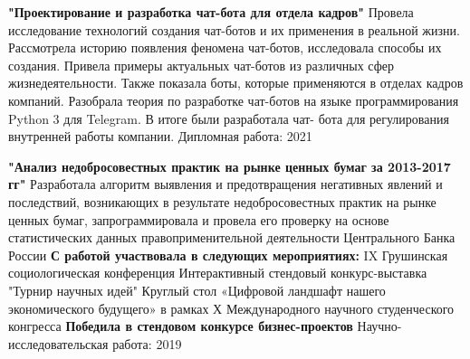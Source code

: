 \documentclass[]{awesome-cv}
\begin{document}
\vspace{-11mm}
\begin{cventries}
\cventry
	{\textbf{"Проектирование и разработка чат-бота для отдела кадров"}
	\newline \qquad \bullet Провела исследование технологий создания чат-ботов и их применения в реальной жизни.  Рассмотрела историю появления феномена чат-ботов, исследовала способы их создания.  Привела примеры актуальных чат-ботов из различных сфер жизнедеятельности. Также показала боты, которые применяются в отделах кадров компаний.  Разобрала теория по разработке чат-ботов на языке программирования Python 3 для Telegram.  В итоге были разработала чат- бота для регулирования внутренней работы компании.
	}
	{Дипломная работа:}
	{2021}
	{}
	{}
		\end{cventries}  \vspace{-6mm} \begin{cventries}
	\cventry
	{\textbf{"Анализ  недобросовестных практик на рынке ценных бумаг за 2013-2017 гг"}
	\newline \qquad \bullet  Разработала алгоритм выявления и предотвращения негативных явлений и последствий, возникающих в результате недобросовестных практик на рынке ценных бумаг, запрограммировала и провела его проверку на основе статистических данных правоприменительной деятельности Центрального Банка России
	\newline 
	\textbf{С работой участвовала в следующих мероприятиях:}
	\newline \quad IX Грушинская социологическая конференция  
	\newline \quad Интерактивный стендовый конкурс-выставка "Турнир научных идей"  
	\newline \quad Круглый стол «Цифровой ландшафт нашего экономического будущего» в рамках Х 
	\newline \quad Международного научного студенческого конгресса
	\newline \textbf{Победила в стендовом конкурсе бизнес-проектов} } 
	{Научно-исследовательская работа:}
	{2019}
	{}
	{}
	\vspace{-7mm}
\end{cventries}
\end{document}
